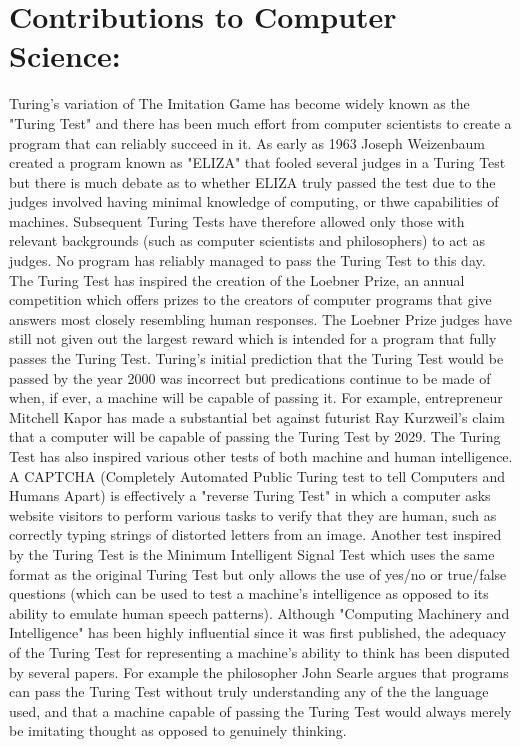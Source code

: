 \documentclass{article}
\begin{document}
\section{Contributions to Computer Science:}

Turing's variation of The Imitation Game has become widely known as the "Turing Test" and there has been much effort from computer scientists to create a program that can reliably succeed in it. As early as 1963 Joseph Weizenbaum created a program known as "ELIZA" that fooled several judges in a Turing Test but there is much debate as to whether ELIZA truly passed the test due to the judges involved having minimal knowledge of computing, or thwe capabilities of machines. Subsequent Turing Tests have therefore allowed only those with relevant backgrounds (such as computer scientists and philosophers) to act as judges. No program has reliably managed to pass the Turing Test to this day.
\break
\break
The Turing Test has inspired the creation of the Loebner Prize, an annual competition which offers prizes to the creators of computer programs that give answers most closely resembling human responses. The Loebner Prize judges have still not given out the largest reward which is intended for a program that fully passes the Turing Test. Turing's initial prediction that the Turing Test would be passed by the year 2000 was incorrect but predications continue to be made of when, if ever, a machine will be capable of passing it. For example, entrepreneur Mitchell Kapor has made a substantial bet against futurist Ray Kurzweil’s claim that a computer will be capable of passing the Turing Test by 2029.
\break
\break
The Turing Test has also inspired various other tests of both machine and human intelligence. A CAPTCHA (Completely Automated Public Turing test to tell Computers and Humans Apart) is effectively a "reverse Turing Test" in which a computer asks website visitors to perform various tasks to verify that they are human, such as correctly typing strings of distorted letters from an image. Another test inspired by the Turing Test is the Minimum Intelligent Signal Test which uses the same format as the original Turing Test but only allows the use of yes/no or true/false questions (which can be used to test a machine's intelligence as opposed to its ability to emulate human speech patterns).
\break
\break
Although "Computing Machinery and Intelligence" has been highly influential since it was first published, the adequacy of the Turing Test for representing a machine’s ability to think has been disputed by several papers. For example the philosopher John Searle argues that programs can pass the Turing Test without truly understanding any of the the language used, and that a machine capable of passing the Turing Test would always merely be imitating thought as opposed to genuinely thinking.\cite{searle1980_mbp}



\end{document}
